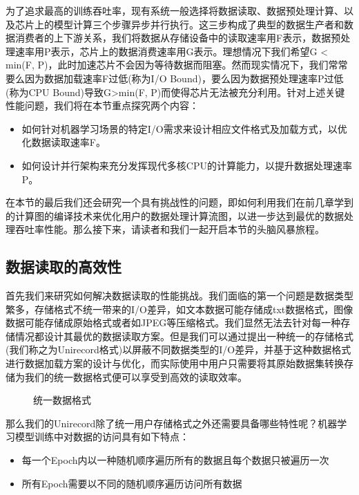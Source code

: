 \documentclass[letterpaper,10pt,english]{sphinxmanual}
\let\sphinxpxdimen\pdfpxdimen\else\newdimen\sphinxpxdimen
\begin{document}
\sphinxAtStartPar
为了追求最高的训练吞吐率，现有系统一般选择将数据读取、数据预处理计算、以及芯片上的模型计算三个步骤异步并行执行。这三步构成了典型的数据生产者和数据消费者的上下游关系，我们将数据从存储设备中的读取速率用F表示，数据预处理速率用P表示，芯片上的数据消费速率用G表示。理想情况下我们希望G
< min(F,
P)，此时加速芯片不会因为等待数据而阻塞。然而现实情况下，我们常常要么因为数据加载速率F过低(称为I/O
Bound)，要么因为数据预处理速率P过低(称为CPU Bound)导致G>min(F,
P)而使得芯片无法被充分利用。针对上述关键性能问题，我们将在本节重点探究两个内容：
\begin{itemize}
\item {} 
\sphinxAtStartPar
如何针对机器学习场景的特定I/O需求来设计相应文件格式及加载方式，以优化数据读取速率F。

\item {} 
\sphinxAtStartPar
如何设计并行架构来充分发挥现代多核CPU的计算能力，以提升数据处理速率P。

\end{itemize}

\sphinxAtStartPar
在本节的最后我们还会研究一个具有挑战性的问题，即如何利用我们在前几章学到的计算图的编译技术来优化用户的数据处理计算流图，以进一步达到最优的数据处理吞吐率性能。那么接下来，请读者和我们一起开启本节的头脑风暴旅程。


\subsection{数据读取的高效性}
\label{\detokenize{chapter_data_processing/performance:id4}}
\sphinxAtStartPar
首先我们来研究如何解决数据读取的性能挑战。我们面临的第一个问题是数据类型繁多，存储格式不统一带来的I/O差异，如文本数据可能存储成txt数据格式，图像数据可能存储成原始格式或者如JPEG等压缩格式。我们显然无法去针对每一种存储情况都设计其最优的数据读取方案。但是我们可以通过提出一种统一的存储格式(我们称之为Unirecord格式)以屏蔽不同数据类型的I/O差异，并基于这种数据格式进行数据加载方案的设计与优化，而实际使用中用户只需要将其原始数据集转换存储为我们的统一数据格式便可以享受到高效的读取效率。

\begin{figure}[H]
\centering
\capstart

\noindent\sphinxincludegraphics[width=800\sphinxpxdimen]{{uni_record}.png}
\caption{统一数据格式}\label{\detokenize{chapter_data_processing/performance:id13}}\label{\detokenize{chapter_data_processing/performance:unified-record-format}}\end{figure}

\sphinxAtStartPar
那么我们的Unirecord除了统一用户存储格式之外还需要具备哪些特性呢？机器学习模型训练中对数据的访问具有如下特点：
\begin{itemize}
\item {} 
\sphinxAtStartPar
每一个Epoch内以一种随机顺序遍历所有的数据且每个数据只被遍历一次

\item {} 
\sphinxAtStartPar
所有Epoch需要以不同的随机顺序遍历访问所有数据

\end{itemize}
\end{document}
